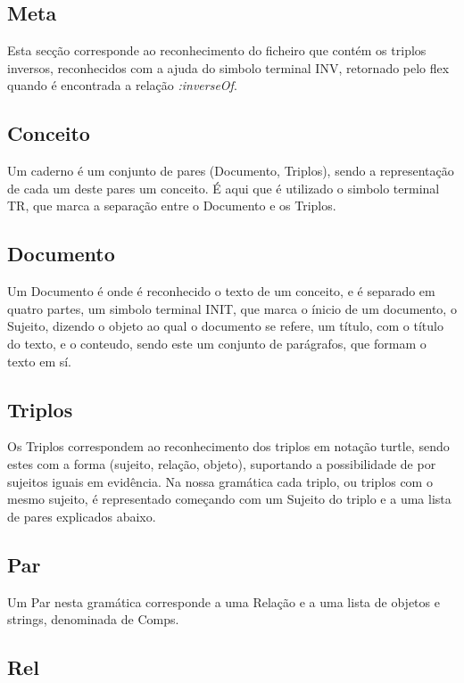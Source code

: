 \documentclass[a4paper]{report}
\begin{document}
\subsection{Meta} 

Esta secção corresponde ao reconhecimento do ficheiro que contém os triplos
inversos, reconhecidos com a ajuda do simbolo terminal INV, retornado pelo flex
quando é encontrada a relação \textit{:inverseOf}.

\subsection{Conceito}

Um caderno é um conjunto de pares (Documento, Triplos), sendo a representação
de cada um deste pares um conceito. É aqui que é utilizado o simbolo terminal
TR, que marca a separação entre o Documento e os Triplos.

\subsection{Documento}

Um Documento é onde é reconhecido o texto de um conceito, e é separado em quatro
partes, um simbolo terminal INIT, que marca o ínicio de um documento, o Sujeito,
dizendo o objeto ao qual o documento se refere, um título, com o título do
texto, e o conteudo, sendo este um conjunto de parágrafos, que formam o texto em
sí.

\subsection{Triplos}

Os Triplos correspondem ao reconhecimento dos triplos em notação turtle, sendo
estes com a forma (sujeito, relação, objeto), suportando a possibilidade de por
sujeitos iguais em evidência. Na nossa gramática cada triplo, ou triplos com o
mesmo sujeito, é representado começando com um Sujeito do triplo e a uma lista
de pares explicados abaixo.

\subsection{Par}

Um Par nesta gramática corresponde a uma Relação e a uma lista de objetos e
strings, denominada de Comps. 

\subsection{Rel}
\end{document}

